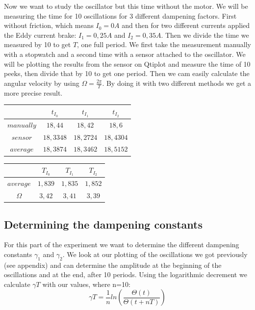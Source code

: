 \documentclass{scrartcl}
\begin{document}
Now we want to study the oscillator but this time without the motor. We will be measuring the time for 10 oscillations for 3 different dampening factors. First without friction, which means $I_0=0A$ and then for two different currents applied the Eddy current brake: $I_1= 0,25A$ and $I_2= 0,35A$. Then we divide the time we measured by 10 to get $T$, one full period. We first take the measurement manually with a stopwatch and a second time with a sensor attached to the oscillator. We will be plotting the results from the sensor on Qtiplot and measure the time of 10 peeks, then divide that by 10 to get one period. Then we cam easily calculate the angular velocity by using $\Omega=\frac{2\pi}{T}$. By doing it with two different methods we get a more precise result.

\medskip
\centering
\begin{tabular}{|c|c|c|c|}
    \hline
    $ $ & $ t_{I_0} $ & $ t_{I_1} $ & $ t_{I_2} $\\
    \hline
    $manually$ & $ 18,44 $ & $ 18,42$ & $18,6$  \\
    \hline
    $sensor$ & $ 18,3348 $ & $ 18,2724$ & $ 18,4304$  \\
    \hline
    $average$ & $ 18,3874 $ & $ 18,3462 $ & $18,5152$  \\
    \hline
\end{tabular}
\medskip

\centering
\begin{tabular}{|c|c|c|c|}
    \hline
    $ $ & $ T_{I_0} $ & $ T_{I_1} $ & $ T_{I_2} $\\
    \hline
    $average$ & $ 1,839 $ & $ 1,835 $ & $1,852$ \\
    \hline
    $\Omega$ & $ 3,42 $ & $ 3,41 $ & $ 3,39 $ \\
    \hline
\end{tabular}
\flushleft


\subsection{Determining the dampening constants}

For this part of the experiment we want to determine the different dampening constants $\gamma_1$ and $\gamma_2$.
We look at our plotting of the oscillations we got previously (see appendix) and can determine the amplitude at the beginning of the oscillations and at the end, after 10 periods.
Using the logarithmic decrement we calculate $\gamma T$ with our values, where n=10:
\begin{equation}
    \gamma T = \frac{1}{n} ln(\frac{\Theta(t)}{\Theta(t+nT)})
\end{equation}
\end{document}
